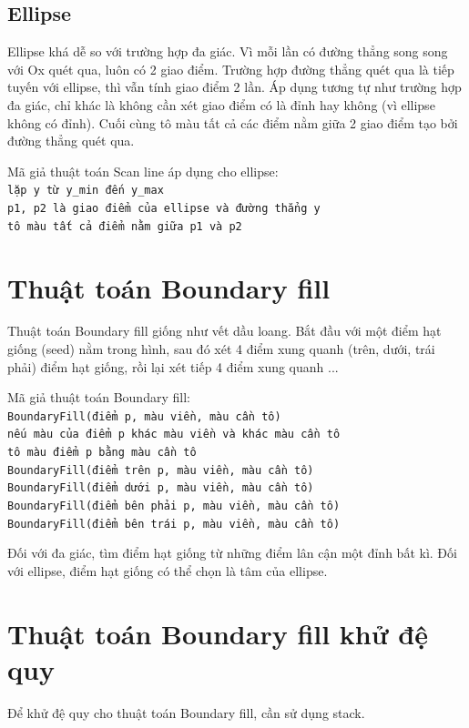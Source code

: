 \documentclass[12pt]{article}
\begin{document}
\subsection{Ellipse}
Ellipse khá dễ so với trường hợp đa giác.
Vì mỗi lần có đường thẳng song song với Ox quét qua, luôn có 2 giao điểm.
Trường hợp đường thẳng quét qua là tiếp tuyến với ellipse, thì vẫn tính giao điểm 2 lần.
Áp dụng tương tự như trường hợp đa giác, chỉ khác là không cần xét giao điểm có là đỉnh hay không
(vì ellipse không có đỉnh). Cuối cùng tô màu tất cả các điểm nằm giữa 2 giao điểm tạo bởi đường thẳng quét qua.

Mã giả thuật toán Scan line áp dụng cho ellipse: \\
\texttt{lặp y từ y\_min đến y\_max} \\
\texttt{\indent p1, p2 là giao điểm của ellipse và đường thẳng y} \\
\texttt{\indent tô màu tất cả điểm nằm giữa p1 và p2}

\section{Thuật toán Boundary fill}
Thuật toán Boundary fill giống như vết dầu loang.
Bắt đầu với một điểm hạt giống (seed) nằm trong hình,
sau đó xét 4 điểm xung quanh (trên, dưới, trái phải) điểm hạt giống,
rồi lại xét tiếp 4 điểm xung quanh ...

Mã giả thuật toán Boundary fill: \\
\texttt{BoundaryFill(điểm p, màu viền, màu cần tô)} \\
\texttt{\indent nếu màu của điểm p khác màu viền và khác màu cần tô} \\
\texttt{\indent\indent tô màu điểm p bằng màu cần tô} \\
\texttt{\indent\indent BoundaryFill(điểm trên p, màu viền, màu cần tô)} \\
\texttt{\indent\indent BoundaryFill(điểm dưới p, màu viền, màu cần tô)} \\
\texttt{\indent\indent BoundaryFill(điểm bên phải p, màu viền, màu cần tô)} \\
\texttt{\indent\indent BoundaryFill(điểm bên trái p, màu viền, màu cần tô)}

Đối với đa giác, tìm điểm hạt giống từ những điểm lân cận một đỉnh bất kì.
Đối với ellipse, điểm hạt giống có thể chọn là tâm của ellipse.

\section{Thuật toán Boundary fill khử đệ quy}
Để khử đệ quy cho thuật toán Boundary fill, cần sử dụng stack.
\end{document}
